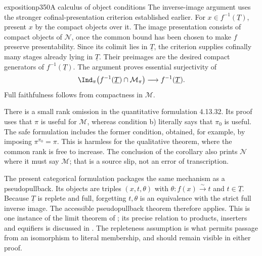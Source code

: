 \begin{dcomment}{exposition}{p350}{A calculus of object conditions}
The inverse-image argument uses the stronger cofinal-presentation criterion established earlier. For $x\in f^{-1}(\underline T)$, present $x$ by the compact objects over it. The image presentation consists of compact objects of $\mathcal N$, once the common bound has been chosen to make $f$ preserve presentability. Since its colimit lies in $\underline T$, the criterion supplies cofinally many stages already lying in $\underline T$. Their preimages are the desired compact generators of $f^{-1}(\underline T)$. The argument proves essential surjectivity of
\[
 \Ind_\pi\bigl(f^{-1}(\underline T)\cap\mathcal M_\pi\bigr)
 \longrightarrow f^{-1}(\underline T).
\]
Full faithfulness follows from compactness in $\mathcal M$.

There is a small rank omission in the quantitative formulation 4.13.32. Its proof uses that $\pi$ is useful for $\mathcal M$, whereas condition b) literally says that $\pi_0$ is useful. The safe formulation includes the former condition, obtained, for example, by imposing $\pi^{\pi_0}=\pi$. This is harmless for the qualitative theorem, where the common rank is free to increase. The conclusion of the corollary also prints $\mathcal N$ where it must say $\mathcal M$; that is a source slip, not an error of transcription.

The present categorical formulation packages the same mechanism as a pseudopullback. Its objects are triples $(x,t,\theta)$ with $\theta:f(x)\xrightarrow{\sim}t$ and $t\in\underline T$. Because $\underline T$ is replete and full, forgetting $t,\theta$ is an equivalence with the strict full inverse image. The accessible pseudopullback theorem therefore applies. This is one instance of the limit theorem of \citet[Theorem 5.1.6]{MakkaiPare1989}; its precise relation to products, inserters and equifiers is discussed in \citet[Introduction and Section 5]{Positselski2024Limits}. The repleteness assumption is what permits passage from an isomorphism to literal membership, and should remain visible in either proof.
\end{dcomment}


